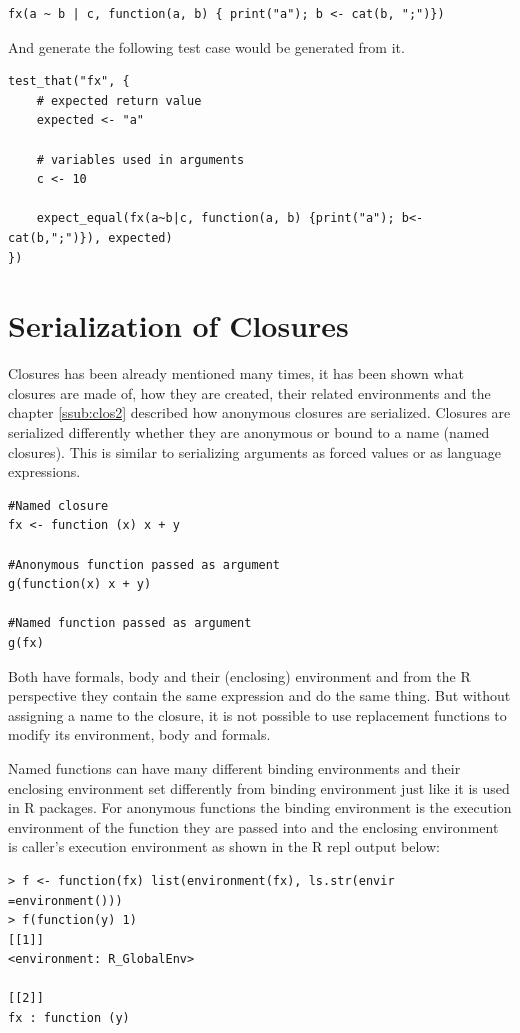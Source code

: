 \documentclass[thesis=B,english]{FITthesis}[2012/10/20]
\begin{document}
\begin{verbatim}
fx(a ~ b | c, function(a, b) { print("a"); b <- cat(b, ";")})
\end{verbatim}

And generate the following test case would be generated from it.
\begin{verbatim}
test_that("fx", {
    # expected return value
    expected <- "a"

    # variables used in arguments
    c <- 10
    
    expect_equal(fx(a~b|c, function(a, b) {print("a"); b<-cat(b,";")}), expected)
})
\end{verbatim}

\chapter{Serialization of Closures} \label{chap:clos}
Closures has been already mentioned many times, it has been shown what closures are made of, how they are created, their related environments and the chapter \ref{ssub:clos2} described how anonymous closures are serialized. Closures are serialized differently whether they are anonymous or bound to a name (named closures). This is similar to serializing arguments as forced values or as language expressions.

\begin{verbatim}
#Named closure
fx <- function (x) x + y

#Anonymous function passed as argument
g(function(x) x + y)

#Named function passed as argument
g(fx)

\end{verbatim}


Both have formals, body and their (enclosing) environment and from the R perspective they contain the same expression and do the same thing. But without assigning a name to the closure, it is not possible to use replacement functions to modify its environment, body and formals. 

Named functions can have many different binding environments and their enclosing environment set differently from binding environment just like it is used in R packages. For anonymous functions the binding environment is the execution environment of the function they are passed into and the enclosing environment is caller’s execution environment as shown in the R repl output below:

\begin{verbatim}
> f <- function(fx) list(environment(fx), ls.str(envir =environment()))
> f(function(y) 1)
[[1]]
<environment: R_GlobalEnv>

[[2]]
fx : function (y)
\end{verbatim}
\end{document}
